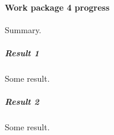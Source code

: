 

\paragraph{Work package 4 progress}

Summary.

\subparagraph{Result 1}

Some result.

\subparagraph{Result 2}

Some result.